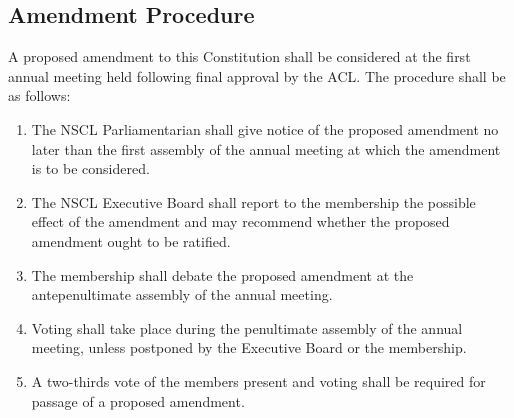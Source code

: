 \documentclass{bylaws_nofont}
\newcommand{\NSCL}{\textsc{NSCL}\xspace}
\newcommand{\ACL}{\textsc{ACL}\xspace}
\begin{document}
\begin{linenumbers}[1]
  \section{Amendment Procedure}
  A proposed amendment to this Constitution shall be considered at the
  first annual meeting held following final approval by the \ACL. The
  procedure shall be as follows:
  \begin{enumerate}
  \item The \NSCL Parliamentarian shall give notice of the proposed
    amendment no later than the first assembly of the annual meeting at
    which the amendment is to be considered.
  \item The \NSCL Executive Board shall report to the membership the
    possible effect of the amendment and may recommend whether the
    proposed amendment ought to be ratified.
  \item The membership shall debate the proposed amendment at the
    antepenultimate assembly of the annual meeting.
  \item Voting shall take place during the penultimate assembly of the
    annual meeting, unless postponed by the Executive Board or the
    membership.
  \item A two-thirds vote of the members present and voting shall be
    required for passage of a proposed amendment.
  \end{enumerate}

\end{linenumbers}

\pagebreak

\end{document}
